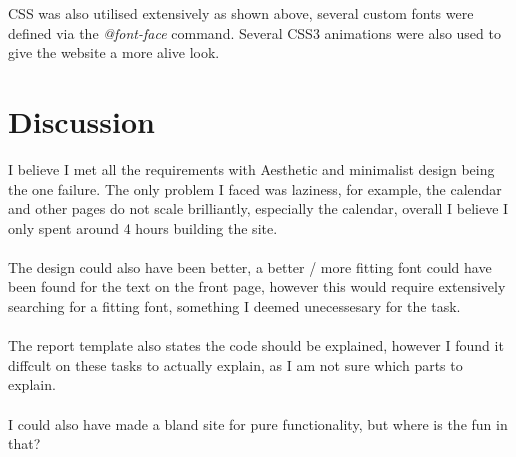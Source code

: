 \documentclass[a4paper]{scrartcl}
\begin{document}
\noindent
CSS was also utilised extensively as shown above, several custom fonts were defined
via the \textit{@font-face} command. Several CSS3 animations were also used to give
the website a more alive look.
\newpage
\section{Discussion}
\noindent
I believe I met all the requirements with Aesthetic and minimalist design being the one failure.
The only problem I faced was laziness, for example, the calendar and other pages do not scale
brilliantly, especially the calendar, overall I believe I only spent around 4 hours building the site.\\\\

\noindent
The design could also have been better, a better / more fitting font could have been found for the
text on the front page, however this would require extensively searching for a fitting font,
something I deemed unecessesary for the task.\\\\

\noindent
The report template also states the code should be explained, however I found it diffcult
on these tasks to actually explain, as I am not sure which parts to explain.\\\\

\noindent
I could also have made a bland site for
pure functionality, but where is the fun in that?
\end{document}

